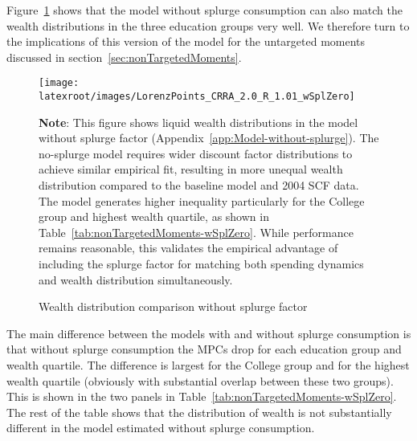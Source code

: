 \documentclass[qe]{econsocart}
\begin{document}
Figure~\ref{fig:LorenzPtsSplZero} shows that the model without splurge consumption can also match the wealth distributions in the three education groups very well. We therefore turn to the implications of this version of the model for the untargeted moments discussed in section~\ref{sec:nonTargetedMoments}.

\begin{figure}[htb] 
  \centering
  \caption{Wealth distribution comparison without splurge factor}
  \label{fig:LorenzPtsSplZero} 
  \texttt{[image: \\latexroot/images/LorenzPoints\_CRRA\_2.0\_R\_1.01\_wSplZero]}

  \medskip
  \noindent\parbox{\textwidth}{\footnotesize
    \textbf{Note}: This figure shows liquid wealth distributions in the model without splurge factor (Appendix~\ref{app:Model-without-splurge}).
    The no-splurge model requires wider discount factor distributions to achieve similar empirical fit,
    resulting in more unequal wealth distribution compared to the baseline model and 2004 SCF data.
    The model generates higher inequality particularly for the College group and highest wealth quartile,
    as shown in Table~\ref{tab:nonTargetedMoments-wSplZero}. While performance remains reasonable,
    this validates the empirical advantage of including the splurge factor for matching both spending
    dynamics and wealth distribution simultaneously.
  }
\end{figure}

\vspace{0.5em}

The main difference between the models with and without splurge consumption is that without splurge consumption the MPCs drop for each education group and wealth quartile.
The difference is largest for the College group and for the highest wealth quartile (obviously with substantial overlap between these two groups). This is shown in the two panels in Table~\ref{tab:nonTargetedMoments-wSplZero}. The rest of the table shows that the distribution of wealth is not substantially different in the model estimated without splurge consumption.
\end{document}
